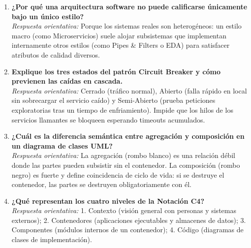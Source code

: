 \begin{enumerate}[leftmargin=1.8em]
  \item \textbf{¿Por qué una arquitectura software no puede calificarse únicamente bajo un único estilo?} \\
  \emph{Respuesta orientativa:} Porque los sistemas reales son heterogéneos: un estilo macro (como Microservicios) suele alojar subsistemas que implementan internamente otros estilos (como Pipes \& Filters o EDA) para satisfacer atributos de calidad diversos.

  \item \textbf{Explique los tres estados del patrón Circuit Breaker y cómo previenen las caídas en cascada.} \\
  \emph{Respuesta orientativa:} Cerrado (tráfico normal), Abierto (falla rápido en local sin sobrecargar el servicio caído) y Semi-Abierto (prueba peticiones exploratorias tras un tiempo de enfriamiento). Impide que los hilos de los servicios llamantes se bloqueen esperando timeouts acumulados.

  \item \textbf{¿Cuál es la diferencia semántica entre agregación y composición en un diagrama de clases UML?} \\
  \emph{Respuesta orientativa:} La agregación (rombo blanco) es una relación débil donde las partes pueden subsistir sin el contenedor. La composición (rombo negro) es fuerte y define coincidencia de ciclo de vida: si se destruye el contenedor, las partes se destruyen obligatoriamente con él.

  \item \textbf{¿Qué representan los cuatro niveles de la Notación C4?} \\
  \emph{Respuesta orientativa:} 1. Contexto (visión general con personas y sistemas externos); 2. Contenedores (aplicaciones ejecutables y almacenes de datos); 3. Componentes (módulos internos de un contenedor); 4. Código (diagramas de clases de implementación).
\end{enumerate}
